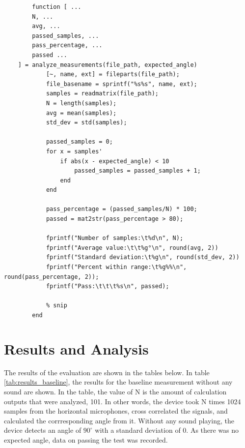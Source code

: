 \documentclass[a4paper]{article}
\begin{document}
\begin{listing}[H]
    \begin{verbatim}
        function [ ...
        N, ...
        avg, ...
        passed_samples, ...
        pass_percentage, ...
        passed ...
    ] = analyze_measurements(file_path, expected_angle) 
            [~, name, ext] = fileparts(file_path);
            file_basename = sprintf("%s%s", name, ext);
            samples = readmatrix(file_path);
            N = length(samples);
            avg = mean(samples);
            std_dev = std(samples);

            passed_samples = 0;
            for x = samples'
                if abs(x - expected_angle) < 10
                    passed_samples = passed_samples + 1;
                end 
            end

            pass_percentage = (passed_samples/N) * 100;
            passed = mat2str(pass_percentage > 80);

            fprintf("Number of samples:\t%d\n", N);
            fprintf("Average value:\t\t%g°\n", round(avg, 2))
            fprintf("Standard deviation:\t%g\n", round(std_dev, 2))
            fprintf("Percent within range:\t%g%%\n", round(pass_percentage, 2));
            fprintf("Pass:\t\t\t%s\n", passed);
            
            % snip
        end
    \end{verbatim}
        \caption{\texttt{analyze\textunderscore measurements.m} Matlab script}
        \label{list:analyze_measurements}
    \end{listing}
    
\section{Results and Analysis}

The results of the evaluation are shown in the tables below. In table \ref{tab:results_baseline}, the results for the baseline measurement without any sound are shown. In the table, the value of N is the amount of calculation outputs that were analyzed, 101. In other words, the device took N times 1024 samples from the horizontal microphones, cross correlated the signals, and calculated the corrresponding angle from it. Without any sound playing, the device detects an angle of $90^{\circ}$ with a standard deviation of $0$. As there was no expected angle, data on passing the test was recorded.
\end{document}
